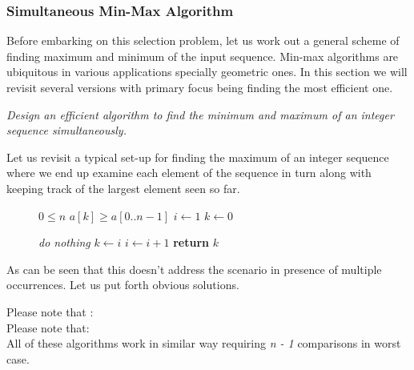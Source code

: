 \subsubsection*{Simultaneous Min-Max Algorithm}
Before embarking on this selection problem, let us work out a general scheme of finding maximum and minimum of the input sequence. Min-max algorithms are ubiquitous in various applications specially geometric ones. In this section we will revisit several versions with primary focus being finding the most efficient one.

\vspace{1mm}

\emph{Design an efficient algorithm to find the minimum and maximum of an integer sequence simultaneously.}

\vspace{1mm}

Let us revisit a typical set-up for finding the maximum of an integer sequence where we end up examine each element of the sequence in turn along with keeping track of the largest element seen so far.

\begin{figure}[H]
\begin{center}
\end{center}
\begin{algorithmic}[1]
    \State $0\le n$
    \State $a[k] \ge a[0..n - 1]$
    \State $i\gets 1$
    \State $k\gets 0$
 
            \State \emph{do nothing}
            \State $k\gets i$
        \EndIf
        \State $i\gets i + 1$
    \EndWhile
    \State \textbf{return} $k$
\EndFunction
\end{algorithmic}
\end{figure}


As can be seen that this doesn\rq{}t address the scenario in presence of multiple occurrences. Let us put forth obvious solutions.



Please note that :\\



Please note that:\\

\vspace{1mm}
All of these algorithms work in similar way requiring \emph{n - 1} comparisons in worst case.

